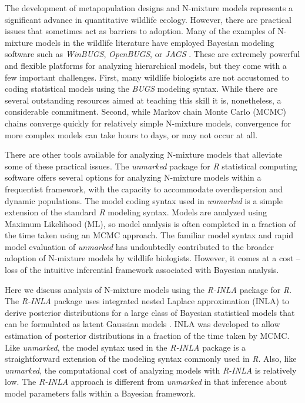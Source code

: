 \documentclass{article}
\begin{document}
The development of metapopulation designs and N-mixture models represents a significant advance in quantitative wildlife ecology. However, there are practical issues that sometimes act as barriers to adoption. Many of the examples of N-mixture models in the wildlife literature have employed Bayesian modeling software such as \emph{WinBUGS}, \emph{OpenBUGS}, or \emph{JAGS} \citep{plummer2003jags,Lunn_Jackson_Best_Thomas_Spiegelhalter_2012}. These are extremely powerful and flexible platforms for analyzing hierarchical models, but they come with a few important challenges.  First, many wildlife biologists are not accustomed to coding statistical models using the \emph{BUGS} modeling syntax. While there are several outstanding resources aimed at teaching this skill \citep{Royle_Dorazio_2008, Kery_2010, Kery_Schaub_2011, Kery_Royle_2015} it is, nonetheless, a considerable commitment. Second, while Markov chain Monte Carlo (MCMC) chains converge quickly for relatively simple N-mixture models, convergence for more complex models can take hours to days, or may not occur at all.

There are other tools available for analyzing N-mixture models that alleviate some of these practical issues.  The \emph{unmarked} package \citep{Fiske_Chandler_others_2011} for \emph{R} statistical computing software \citep{R_Core_Team_2016} offers several options for analyzing N-mixture models within a frequentist framework, with the capacity to accommodate overdispersion and dynamic populations. The model coding syntax used in \emph{unmarked} is a simple extension of the standard \emph{R} modeling syntax. Models are analyzed using Maximum Likelihood (ML), so model analysis is often completed in a fraction of the time taken using an MCMC approach. The familiar model syntax and rapid model evaluation of \emph{unmarked} has undoubtedly contributed to the broader adoption of N-mixture models by wildlife biologists. However, it comes at a cost -- loss of the intuitive inferential framework associated with Bayesian analysis.

Here we discuss analysis of N-mixture models using the \emph{R-INLA} package \citep{Martins_Simpson_Lindgren_Rue_2013,Rue_Riebler_Sorbye_Illian_Simpson_Lindgren_2017} for \emph{R}. The \emph{R-INLA} package uses integrated nested Laplace approximation (INLA) to derive posterior distributions for a large class of Bayesian statistical models that can be formulated as latent Gaussian models \citep{Rue_Martino_Chopin_2009, Lindgren_Rue_Lindstrom_2011}. INLA was developed to allow estimation of posterior distributions in a fraction of the time taken by MCMC. Like \emph{unmarked}, the model syntax used in the \emph{R-INLA} package is a straightforward extension of the modeling syntax commonly used in \emph{R}. Also, like \emph{unmarked}, the computational cost of analyzing models with \emph{R-INLA} is relatively low. The \emph{R-INLA} approach is different from \emph{unmarked} in that inference about model parameters falls within a Bayesian framework.
\end{document}
